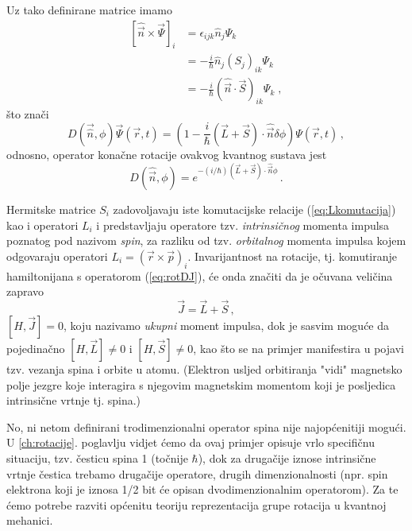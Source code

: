 Uz tako definirane matrice imamo
\begin{equation}
\begin{split}
[\hat{\vec{n}}\times\vec{\Psi}]_i &=
\epsilon_{ijk}\hat{n}_j\Psi_k \\
&= -\frac{i}{\hbar}\hat{n}_j (S_j)_{ik}\Psi_k\\
&= -\frac{i}{\hbar}(\hat{\vec{n}}\cdot\vec{S})_{ik}\Psi_k \;,
\end{split}
\end{equation}
što znači
\begin{equation*}
D(\vec{\hat{n}},\phi)\vec{\Psi}(\vec{r}, t)=
 \left(1-\frac{i}{\hbar}(\vec{L}+\vec{S})\cdot\hat{\vec{n}}\delta\phi \right)
  \Psi(\vec{r}, t) \,,
\end{equation*}
odnosno, operator konačne rotacije ovakvog kvantnog sustava jest
\begin{equation}
D(\hat{\vec{n}}, \phi)=
 e^{-(i/\hbar)(\vec{L}+\vec{S})\cdot\hat{\vec{n}}\phi} \,.
 \label{eq:rotDJ}
\end{equation}

Hermitske matrice $S_i$ zadovoljavaju iste komutacijske relacije
(\ref{eq:Lkomutacija}) kao i operatori $L_i$ i predstavljaju operatore tzv.
\emph{intrinsičnog}  momenta impulsa poznatog pod nazivom \emph{spin},
za razliku od tzv. \emph{orbitalnog} momenta impulsa kojem odgovaraju
operatori $L_i = (\vec{r}\times\vec{p})_{i}$.
Invarijantnost na rotacije, tj. komutiranje hamiltonijana s operatorom
(\ref{eq:rotDJ}), će onda značiti da je očuvana veličina zapravo
\begin{equation}
\vec{J}=\vec{L}+\vec{S} \,,
\end{equation}
$[H, \vec{J}] = 0$, koju nazivamo \emph{ukupni} moment impulsa, dok je sasvim moguće
da pojedinačno $[H, \vec{L}] \neq 0$ i $[H, \vec{S}] \neq 0$, kao što se na
primjer manifestira u pojavi tzv. vezanja spina i orbite u atomu.
(Elektron usljed orbitiranja "vidi" magnetsko polje
jezgre koje interagira s njegovim magnetskim momentom koji je posljedica
intrinsične vrtnje tj. spina.)

No, ni netom definirani trodimenzionalni operator spina nije najopćenitiji mogući.
U \ref{ch:rotacije}. poglavlju vidjet ćemo da ovaj primjer opisuje
vrlo specifičnu situaciju, tzv. česticu spina 1 (točnije $\hbar$),
dok za drugačije iznose intrinsične vrtnje čestica trebamo drugačije
operatore, drugih dimenzionalnosti (npr. spin elektrona koji je iznosa 1/2 
bit će opisan dvodimenzionalnim operatorom).
Za te ćemo potrebe razviti općenitu teoriju
reprezentacija grupe rotacija u kvantnoj mehanici.


